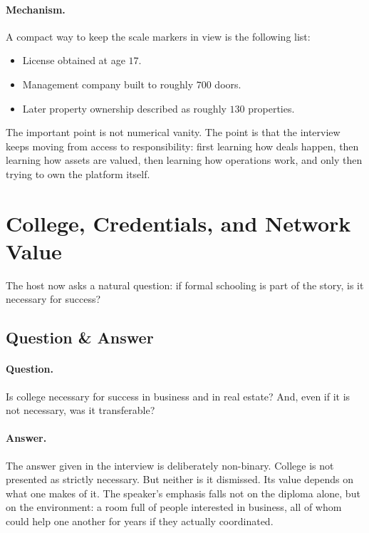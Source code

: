 \paragraph{Mechanism.}
A compact way to keep the scale markers in view is the following list:
\begin{itemize}
\item License obtained at age \(17\).
\item Management company built to roughly \(700\) doors.
\item Later property ownership described as roughly \(130\) properties.
\end{itemize}
The important point is not numerical vanity. The point is that the interview keeps moving from access to responsibility: first learning how deals happen, then learning how assets are valued, then learning how operations work, and only then trying to own the platform itself.

\section{College, Credentials, and Network Value}

The host now asks a natural question: if formal schooling is part of the story, is it necessary for success?

\subsection{Question \& Answer}

\paragraph{Question.}
Is college necessary for success in business and in real estate? And, even if it is not necessary, was it transferable?

\paragraph{Answer.}
The answer given in the interview is deliberately non-binary. College is not presented as strictly necessary. But neither is it dismissed. Its value depends on what one makes of it. The speaker's emphasis falls not on the diploma alone, but on the environment: a room full of people interested in business, all of whom could help one another for years if they actually coordinated.

